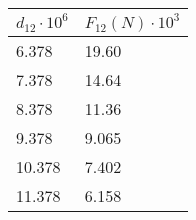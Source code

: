 \begin{tabular}{| l | l |}
\hline
$d_{12} \cdot 10^6$ & $F_{12} (N) \cdot 10^3$\\ \hline
6.378 & 19.60\\ \hline
7.378 & 14.64\\ \hline
8.378 & 11.36\\ \hline
9.378 & 9.065\\ \hline
10.378 & 7.402\\ \hline
11.378 & 6.158\\ \hline
\end{tabular}